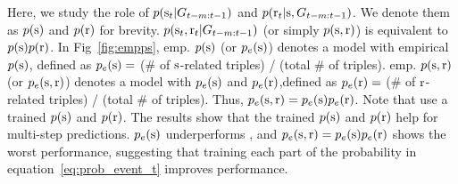 Here, we study the role of $p(\mathrm{s}_{t}|G_{t-m:t-1})$ and $p(\mathrm{r}_{t}|\mathrm{s},G_{t-m:t-1})$. 
We denote them as $p(\mathrm{s})$ and $p(\mathrm{r})$ for brevity. 
$p(\mathrm{s}_t, \mathrm{r}_t| G_{t-m:t-1})$ (or simply $p(\mathrm{s}, \mathrm{r})$) is equivalent to $p(\mathrm{s}) p(\mathrm{r})$.
In Fig~\ref{fig:empps}, emp. $p(\mathrm{s})$ (or $p_e(\mathrm{s})$) denotes a model with empirical $p(\mathrm{s})$, defined as $p_e(\mathrm{s})=$ (\# of $\mathrm{s}$-related triples) / (total \# of triples). 
emp. $p(\mathrm{s},\mathrm{r})$ (or $p_e(\mathrm{s},\mathrm{r})$) denotes a model with $p_e(\mathrm{s})$ and $p_e(\mathrm{r})$,defined as $p_e(\mathrm{r})=$ (\# of $\mathrm{r}$-related triples) / (total \# of triples). Thus, $p_e(\mathrm{s},\mathrm{r}) = p_e(\mathrm{s}) p_e(\mathrm{r})$. 
Note that \method use a trained $p(\mathrm{s})$ and $p(\mathrm{r})$.
The results show that the trained $p(\mathrm{s})$ and $p(\mathrm{r})$ help \method for multi-step predictions. 
$p_e(\mathrm{s})$ underperforms \method, and $p_e(\mathrm{s},\mathrm{r})=p_e(\mathrm{s}) p_e(\mathrm{r})$ shows the worst performance, suggesting that training each part of the probability in equation~\eqref{eq:prob_event_t} improves performance.









